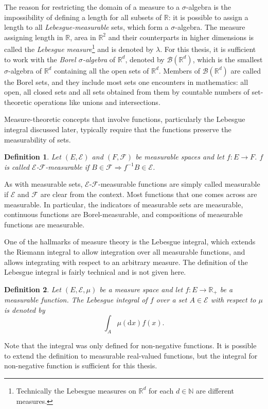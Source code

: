 \documentclass[english,twoside,openright]{HYgraduMLDS}
\newtheorem{definition}{Definition}
\newcommand{\R}{\mathbb{R}}
\newcommand{\N}{\mathbb{N}}
\newcommand{\dx}{\mathrm{d}}
\begin{document}
The reason for restricting the domain of a measure to a \(\sigma\)-algebra
is the impossibility of defining a length for all subsets of \(\R\): it is
possible to assign a length to all \emph{Lebesgue-measurable} sets, which form
a \(\sigma\)-algebra. The measure assigning length in \(\R\), area in \(\R^{2}\)
and their counterparts in higher dimensions is called the
\emph{Lebesgue measure}\footnote{
  Technically the Lebesgue measures on \(\R^{d}\) for each \(d\in \N\) are
  different measures.
} and is denoted by \(\lambda\). For this thesis, it is sufficient to
work with the \emph{Borel \(\sigma\)-algebra} of \(\R^{d}\), denoted by
\(\mathcal{B}(\R^{d})\), which is
the smallest \(\sigma\)-algebra of \(\R^{d}\) containing all the open sets
of \(\R^{d}\). Members of \(\mathcal{B}(\R^{d})\) are called the Borel sets,
and they include most sets one encounters in mathematics: all open, all closed
sets and all sets obtained from them by countable numbers of set-theoretic
operations like unions and intersections.

Measure-theoretic concepts that involve functions, particularly the
Lebesgue integral discussed later, typically require that the functions
preserve the measurability of sets.
\begin{definition}
	Let \((E, \mathcal{E})\) and \((F, \mathcal{F})\) be measurable spaces
  and let \(f\colon E\to F\). \(f\) is called
  \(\mathcal{E}\)-\(\mathcal{F}\)-measurable if
  \(B\in \mathcal{F}\Rightarrow f^{-1}B\in \mathcal{E}\).
\end{definition}
As with measurable sets, \(\mathcal{E}\)-\(\mathcal{F}\)-measurable functions
are simply called measurable if \(\mathcal{E}\) and \(\mathcal{F}\) are
clear from the context.
Most functions that one comes across are measurable. In particular,
the indicators of measurable sets are measurable, continuous functions are
Borel-measurable, and compositions of measurable functions are measurable.

One of the hallmarks of measure theory is the Lebesgue integral, which
extends the Riemann integral to allow integration over all measurable functions,
and allows integrating with respect to an arbitrary measure. The definition
of the Lebesgue integral is fairly technical and is not given here.

\begin{definition}
	Let \((E, \mathcal{E}, \mu)\) be a measure space and let \(f\colon E\to \R_{+}\)
  be a measurable function. The Lebesgue integral of \(f\) over a set
  \(A\in \mathcal{E}\) with respect to \(\mu\) is denoted by
  \[
    \int_{A}\mu(\dx x)f(x).
  \]
\end{definition}
Note that the integral was only defined for non-negative functions. It is possible
to extend the definition to measurable real-valued functions,
but the integral for non-negative function is sufficient for this thesis.
\end{document}
